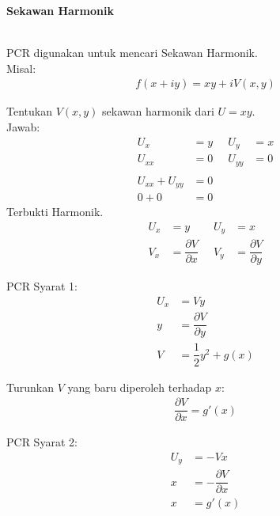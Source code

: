 \documentclass{article}
\begin{document}
    \newpage
    \begin{center}
        \textbf{Sekawan Harmonik}
    \end{center}
    \leavevmode\\
    
    PCR digunakan untuk mencari Sekawan Harmonik.\\

    Misal:
    \begin{align}
        f(x + iy) = xy + iV(x, y)
        \nonumber
    \end{align}

    Tentukan $V(x,y)$ sekawan harmonik dari $U = xy$.\\
    Jawab:
    \begin{align}
        U_x     &= y    \;&\;   U_y     &= x
        \nonumber\\
        U_{xx}  &= 0    \;&\;   U_{yy}  &= 0   
        \nonumber\\\nonumber\\
        U_{xx}+U_{yy}&=0
        \nonumber\\
        0 + 0   &=0
        \nonumber
    \end{align}
    Terbukti Harmonik.\\

    \begin{align}
        U_x &= y                                \;&\;   U_y &= x
        \nonumber\\
        V_x &= \dfrac{\partial V}{\partial x}   \;&\;   V_y&= \dfrac{\partial V}{\partial y}
        \nonumber
    \end{align}

    PCR Syarat 1:
    \begin{align}
        U_x &= Vy
        \nonumber\\
        y   &= \dfrac{\partial V}{\partial y}
        \nonumber\\
        V   &= \dfrac{1}{2} y^2 + g(x)
        \nonumber
    \end{align}

    Turunkan $V$ yang baru diperoleh terhadap $x$:
    \begin{align}
        \dfrac{\partial V}{\partial x} = g'(x)
        \nonumber
    \end{align}

    PCR Syarat 2:
    \begin{align}
        U_y &= -Vx
        \nonumber\\
        x   &= -\dfrac{\partial V}{\partial x}
        \nonumber\\
        x   &= g'(x)
        \nonumber
    \end{align}
\end{document}
